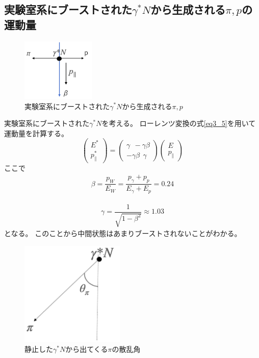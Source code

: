 \subsection{実験室系にブーストされた$\gamma^* N$から生成される$\pi,p$の運動量}
\begin{figure}[H]
    \centering
    \includegraphics[height=3cm]{img/boost_middle_situation.png}
    \caption{実験室系にブーストされた$\gamma^* N$から生成される$\pi,p$}
    \label{fig:angle6}
\end{figure}
実験室系にブーストされた$\gamma^* N$を考える。
ローレンツ変換の式\ref{eq3_5}を用いて運動量を計算する。
\begin{equation}
    \label{eq3_5}
    \left(\begin{array}{c}
            E^* \\
            p^*_\parallel
        \end{array}\right)
    =\left(\begin{array}{cc}
            \gamma \ \ -\gamma \beta \\
            -\gamma \beta  \ \  \gamma
        \end{array}\right)
    \left(\begin{array}{c}
            E \\
            p_\parallel
        \end{array}\right)
\end{equation}
ここで
\begin{eqnarray}
    \beta = \dfrac{p_W}{E_W} = \dfrac{p_\gamma + p_p}{E_\gamma + E_p} = 0.24
\end{eqnarray}

\begin{eqnarray}
    \gamma = \dfrac{1}{\sqrt{1 - \beta^2}} \approx 1.03
\end{eqnarray}
となる。
このことから中間状態はあまりブーストされないことがわかる。

\begin{figure}[H]
    \centering
    \includegraphics[height=5cm]{img/theta_pi.png}
    \caption{静止した$\gamma^* N$から出てくる$\pi$の散乱角}
    \label{fig:angle7}
\end{figure}

